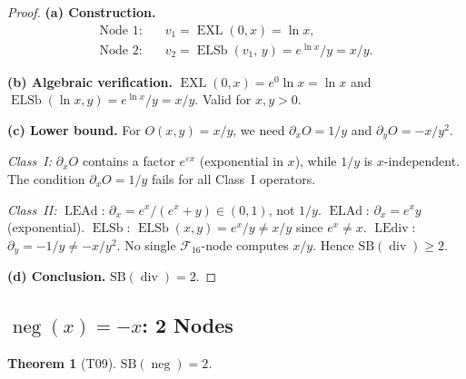 \documentclass[12pt,a4paper]{article}
\newtheorem{theorem}{Theorem}[section]
\theoremstyle{definition}
\newcommand{\EXL}{\operatorname{EXL}}
\newcommand{\ELAd}{\operatorname{ELAd}}
\newcommand{\ELSb}{\operatorname{ELSb}}
\newcommand{\LEAd}{\operatorname{LEAd}}
\newcommand{\LEdiv}{\operatorname{LEdiv}}
\newcommand{\divop}{\operatorname{div}}
\newcommand{\negop}{\operatorname{neg}}
\newcommand{\SB}{\mathrm{SB}}
\newcommand{\F}{\mathcal{F}_{16}}
\begin{document}
\begin{proof}
\textbf{(a) Construction.}
\begin{align*}
  \text{Node 1:} &\quad v_1 = \EXL(0,x) = \ln x, \\
  \text{Node 2:} &\quad v_2 = \ELSb(v_1,\,y) = e^{\ln x}/y = x/y.
\end{align*}

\textbf{(b) Algebraic verification.}
$\EXL(0,x) = e^0 \ln x = \ln x$ and $\ELSb(\ln x,y) = e^{\ln x}/y = x/y$.
Valid for $x, y > 0$.

\textbf{(c) Lower bound.}
For $O(x,y) = x/y$, we need $\partial_x O = 1/y$ and $\partial_y O = -x/y^2$.

\emph{Class~I:} $\partial_x O$ contains a factor $e^{\varepsilon x}$ (exponential in $x$),
while $1/y$ is $x$-independent.  The condition $\partial_x O = 1/y$ fails for all
Class~I operators.

\emph{Class~II:}
$\LEAd$: $\partial_x = e^x/(e^x+y) \in (0,1)$, not $1/y$.
$\ELAd$: $\partial_x = e^x y$ (exponential).
$\ELSb$: $\ELSb(x,y) = e^x/y \ne x/y$ since $e^x \ne x$.
$\LEdiv$: $\partial_y = -1/y \ne -x/y^2$.
No single $\F$-node computes $x/y$.  Hence $\SB(\divop) \ge 2$.

\textbf{(d) Conclusion.} $\SB(\divop) = 2$.
\end{proof}

\subsection{\texorpdfstring{$\negop(x) = -x$}{neg(x)}: 2 Nodes}
\label{sec:neg}

\begin{theorem}[T09]
\label{thm:neg}
$\SB(\negop) = 2$.
\end{theorem}
\end{document}
